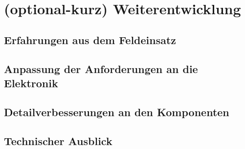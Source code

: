 \chapter{(optional-kurz) Weiterentwicklung}\label{cha:Weiterentwicklung}

\section{Erfahrungen aus dem Feldeinsatz}

\section{Anpassung der Anforderungen an die Elektronik}

\section{Detailverbesserungen an den Komponenten}

\section{Technischer Ausblick}